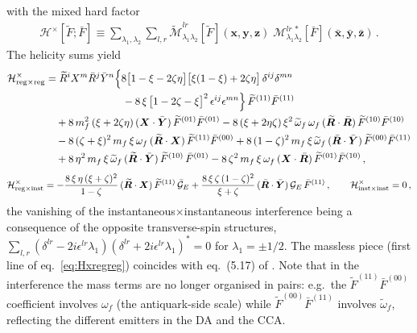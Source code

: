 \documentclass[11pt,a4paper]{article}
\newcommand{\calG}{\mathcal{G}}
\newcommand{\calM}{\mathcal{M}}
\newcommand{\calH}{\mathcal{H}}
\newcommand{\vx}{\bm{x}}
\newcommand{\vy}{\bm{y}}
\newcommand{\vz}{\bm{z}}
\newcommand{\vxb}{\bar{\bm{x}}}
\newcommand{\vyb}{\bar{\bm{y}}}
\newcommand{\vzb}{\bar{\bm{z}}}
\newcommand{\vR}{\bm{R}}
\newcommand{\vY}{\bm{Y}}
\newcommand{\vX}{\bm{X}}
\newcommand{\vRt}{\widetilde{\bm{R}}}
\numberwithin{equation}{section}
\begin{document}
with the mixed hard factor
\begin{align}
\calH^{\times}[\widetilde F;\bar F] \equiv \sum_{\lambda_{1},\lambda_{2}}\sum_{l,r}
\widetilde{\calM}^{lr}_{\lambda_{1}\lambda_{2}}[\widetilde F](\vx,\vy,\vz)\;
\calM^{lr\,*}_{\lambda_{1}\lambda_{2}}[\bar F](\vxb,\vyb,\vzb)\,.
\end{align}
The helicity sums yield
\begin{align}
\label{eq:Hxregreg}
\calH^{\times}_{\rm reg\times reg} &= \widetilde R^{i}X^{m}\bar{R}^{j}\bar{Y}^{n}
\Big\{8\big[1-\xi-2\zeta\eta\big]\big[\xi(1-\xi) + 2\zeta\eta\big]\,\delta^{ij}\delta^{mn}\notag\\
&\hspace*{2.6cm}-8\,\xi\,\big[1-2\zeta-\xi\big]^{2}\,\epsilon^{ij}\epsilon^{mn}\Big\}\,
\widetilde F^{(11)}\bar{F}^{(11)} \notag\\
&\quad +8\,m^{2}_{f}\,(\xi +2\zeta\eta)\, (\vX\cdot \bar{\vY})\,
\widetilde F^{(01)}\bar{F}^{(01)}
- 8\,(\xi + 2\eta\zeta)\,\xi^{2}\,\widetilde\omega_{f}\,\omega_{f}\,
(\vRt\cdot\bar{\vR})\,\widetilde F^{(10)}\bar{F}^{(10)} \notag\\
&\quad - 8\,(\zeta + \xi)^{2}\,m_{f}\,\xi\,\omega_{f}\,(\vRt\cdot \vX)\,
\widetilde F^{(11)}\bar{F}^{(00)}
+ 8\,(1-\zeta)^{2}\,m_{f}\,\xi\,\widetilde\omega_{f}\,(\bar{\vR}\cdot \bar{\vY})\,
\widetilde F^{(00)}\bar{F}^{(11)} \notag\\
&\quad +8\,\eta^{2}\,m_{f}\,\xi\, \widetilde\omega_{f}\,(\vRt\cdot \bar{\vY})\,
\widetilde F^{(10)}\,\bar{F}^{(01)}
-8\,\zeta^{2}\,m_{f}\,\xi\,\omega_{f}\,(\vX\cdot \bar{\vR})\,
\widetilde F^{(01)}\bar{F}^{(10)}\,,
\end{align}
\begin{align}
\label{eq:Hxreginst}
\calH^{\times}_{\rm reg\times inst} = -\frac{8\,\xi\,\eta\, (\xi +\zeta)^{2}}{1-\zeta}\,
(\vRt\cdot \vX)\,\widetilde F^{(11)}\,\bar{\calG}_{E}
+ \frac{8\,\xi\,\zeta\,(1-\zeta)^{2}}{\xi + \zeta}\,(\bar{\vR}\cdot \bar{\vY})\,
\calG_{E}\,\bar{F}^{(11)}\,,
\qquad
\calH^{\times}_{\rm inst\times inst} = 0\,,
\end{align}
the vanishing of the instantaneous$\times$instantaneous interference being a consequence of
the opposite transverse-spin structures, $\sum_{l,r}(\delta^{lr}-2i\epsilon^{lr}\lambda_{1})
(\delta^{lr}+2i\epsilon^{lr}\lambda_{1})^{*} = 0$ for $\lambda_1=\pm 1/2$. The massless piece
(first line of eq.~\eqref{eq:Hxregreg}) coincides with eq.~(5.17) of \cite{Iancu:2022gpw}.
Note that in the interference the mass terms are no longer organised in pairs: e.g.\ the
$\widetilde F^{(11)}\bar F^{(00)}$ coefficient involves $\omega_f$ (the antiquark-side scale)
while $\widetilde F^{(00)}\bar F^{(11)}$ involves $\widetilde\omega_f$, reflecting the
different emitters in the DA and the CCA.
\end{document}
